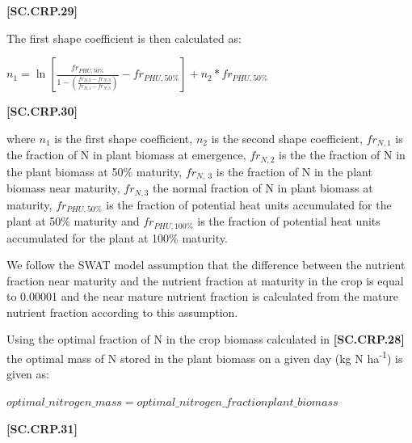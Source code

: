             {\raggedleft \textbf{[SC.CRP.29]}\par}
            \vspace{0.5cm}

The first shape coefficient is then calculated as:
    \vspace{0.2cm}

    \begin{center}
        \(n_{1}=\ln \left [\frac{fr_{PHU,50\%}}{1-(\frac{fr_{N,2}-fr_{N,3}}{fr_{N,1}-fr_{N,3}})}-fr_{PHU,50\%}\right ] + n_2 * fr_{PHU,50\%}\)
    \end{center}
        \vspace{0.5cm}
    
            {\raggedleft \textbf{[SC.CRP.30]}\par}
            \vspace{0.5cm}
            
where \(n_1\) is the first shape coefficient, \(n_2\) is the second shape coefficient, \(fr_{N,1}\) is the fraction of N in plant biomass at emergence, \(fr_{N,2}\) is the the fraction of N in the plant biomass at 50\% maturity, \(fr_{N,~3}\) is the fraction of N in the plant biomass near maturity, \(fr_{N,3}\) the normal fraction of N in plant biomass at maturity, \(fr_{PHU,50\%}\) is the fraction of potential heat units accumulated for the plant at 50\% maturity and \(fr_{PHU,100\%}\) is the fraction of potential heat units accumulated for the plant at 100\% maturity.

We follow the SWAT model assumption that the difference between the nutrient fraction near maturity and the nutrient fraction at maturity in the crop is equal to 0.00001 and the near mature nutrient fraction is calculated from the mature nutrient fraction according to this assumption.



Using the optimal fraction of N in the crop biomass calculated in \textbf{[SC.CRP.28]} the optimal mass of N stored in the plant biomass on a given day (kg N ha\textsuperscript{-1}) is given as:
    \vspace{0.2cm}

    \begin{center}
        \(optimal\_nitrogen\_mass=optimal\_nitrogen\_fractionplant\_biomass\)
    \end{center}
        \vspace{0.5cm}
    
            {\raggedleft \textbf{[SC.CRP.31]}\par}
            \vspace{0.5cm}

